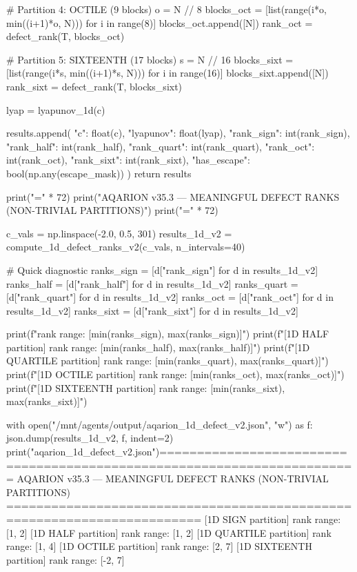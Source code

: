 {{{{{{{{{{{{{        # Partition 4: OCTILE (9 blocks)
        o = N // 8
        blocks_oct = [list(range(i*o, min((i+1)*o, N))) for i in range(8)]
        blocks_oct.append([N])
        rank_oct = defect_rank(T, blocks_oct)
        
        # Partition 5: SIXTEENTH (17 blocks)
        s = N // 16
        blocks_sixt = [list(range(i*s, min((i+1)*s, N))) for i in range(16)]
        blocks_sixt.append([N])
        rank_sixt = defect_rank(T, blocks_sixt)
        
        lyap = lyapunov_1d(c)
        
        results.append({
            "c": float(c),
            "lyapunov": float(lyap),
            "rank_sign": int(rank_sign),
            "rank_half": int(rank_half),
            "rank_quart": int(rank_quart),
            "rank_oct": int(rank_oct),
            "rank_sixt": int(rank_sixt),
            "has_escape": bool(np.any(escape_mask))
        })
    return results

print("=" * 72)
print("AQARION v35.3 — MEANINGFUL DEFECT RANKS (NON-TRIVIAL PARTITIONS)")
print("=" * 72)

c_vals = np.linspace(-2.0, 0.5, 301)
results_1d_v2 = compute_1d_defect_ranks_v2(c_vals, n_intervals=40)

# Quick diagnostic
ranks_sign = [d["rank_sign"] for d in results_1d_v2]
ranks_half = [d["rank_half"] for d in results_1d_v2]
ranks_quart = [d["rank_quart"] for d in results_1d_v2]
ranks_oct = [d["rank_oct"] for d in results_1d_v2]
ranks_sixt = [d["rank_sixt"] for d in results_1d_v2]

print(f"     rank range: [{min(ranks_sign)}, {max(ranks_sign)}]")
print(f"[1D HALF partition]     rank range: [{min(ranks_half)}, {max(ranks_half)}]")
print(f"[1D QUARTILE partition] rank range: [{min(ranks_quart)}, {max(ranks_quart)}]")
print(f"[1D OCTILE partition]   rank range: [{min(ranks_oct)}, {max(ranks_oct)}]")
print(f"[1D SIXTEENTH partition] rank range: [{min(ranks_sixt)}, {max(ranks_sixt)}]")

with open("/mnt/agents/output/aqarion_1d_defect_v2.json", "w") as f:
    json.dump(results_1d_v2, f, indent=2)
print("\n[Saved] aqarion_1d_defect_v2.json")========================================================================
AQARION v35.3 — MEANINGFUL DEFECT RANKS (NON-TRIVIAL PARTITIONS)
========================================================================
[1D SIGN partition]     rank range: [1, 2]
[1D HALF partition]     rank range: [1, 2]
[1D QUARTILE partition] rank range: [1, 4]
[1D OCTILE partition]   rank range: [2, 7]
[1D SIXTEENTH partition] rank range: [-2, 7]

}}}}}}}}}}}}}
